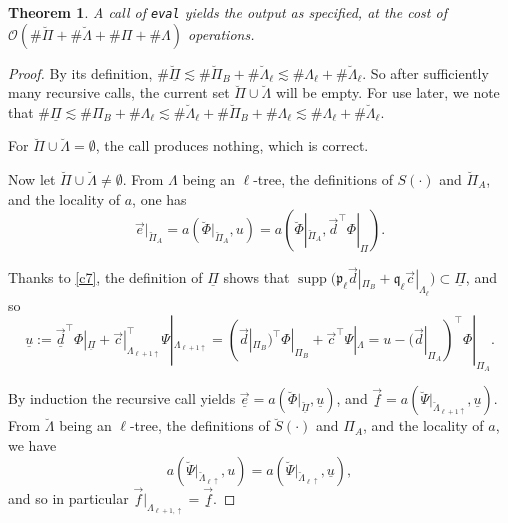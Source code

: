 \documentclass{amsart}
\newtheorem{theorem}{Theorem}[section]
\theoremstyle{definition}
\theoremstyle{remark}
\numberwithin{equation}{section}
\DeclareMathOperator{\supp}{supp}
\newcommand{\1}{\mathbb 1}
\begin{document}
\newpage
 
 \begin{theorem} A call of \texttt{eval} yields the output as specified, at the cost of
 ${\mathcal O}(\# \breve{\Pi}+\# \breve{\Lambda}+\# \Pi+\# \Lambda)$ operations.
 
 \end{theorem}
 
 \begin{proof}
By its definition, $\# \breve{\underline{\Pi}} \lesssim \#\breve{\Pi}_B +\# \breve{\Lambda}_\ell \lesssim \# \Lambda_\ell+\# \breve{\Lambda}_\ell$. So after sufficiently many recursive calls, the current set  $\breve{\Pi}  \cup \breve{\Lambda}$ will be empty.
For use later, we note that 
 $\# \underline{\Pi}  \lesssim \#\Pi_B +\#\Lambda_\ell \lesssim \#\breve{\Lambda}_\ell+\#\breve{\Pi}_B +\#\Lambda_\ell \lesssim \#\Lambda_\ell+\#\breve{\Lambda}_\ell$.

 For $\breve{\Pi}  \cup \breve{\Lambda}= \emptyset$, the call produces nothing, which is correct.
  

Now let  $\breve{\Pi}  \cup \breve{\Lambda} \neq \emptyset$.
From $\Lambda$ being an $\ell$-tree, the definitions of $S(\cdot)$ and $\breve{\Pi}_A$, and the locality of $a$, one has
 $$
 \vec{e}|_{\breve{\Pi}_A}=a(\breve{\Phi}|_{\breve{\Pi}_A},u)=a(\breve{\Phi}|_{\breve{\Pi}_A},\vec{d}^\top\Phi|_{\Pi}).
 $$
 
 Thanks to \eqref{c7}, the definition of $\underline{\Pi}$ shows that $\supp \big( \mathfrak{p}_{\ell} \vec{d}|_{\Pi_B}+\mathfrak{q}_\ell \vec{c}|_{\Lambda_{\ell}}\big) \subset \underline{\Pi}$, and so
  $$
 \underline{u}:=\underline{\vec{d}}^\top\Phi|_{\underline{\Pi}}+\vec{c}|_{\Lambda_{\ell+1\uparrow}}^\top \Psi|_{\Lambda_{\ell+1\uparrow}} =(\vec{d}|_{\Pi_B})^\top \Phi|_{\Pi_B} +\vec{c}^\top \Psi|_{\Lambda}=u-(\vec{d}|_{\Pi_A})^\top \Phi|_{\Pi_A}.
 $$
 
By induction the recursive call  yields
 $\underline{\vec{e}}=a(\breve{\Phi}|_{\breve{\underline{\Pi}}}, \underline{u})$, and
 $\underline{\vec{f}}=a(\breve{\Psi}|_{\breve{\Lambda}_{\ell+1 \uparrow}}, \underline{u})$.
 From  $\breve{\Lambda}$ being an $\ell$-tree, the definitions of $\breve{S}(\cdot)$ and $\Pi_A$, and the locality of $a$, we have
 $$
 a(\breve{\Psi}|_{\breve{\Lambda}_{\ell \uparrow}}, u)=a(\breve{\Psi}|_{\breve{\Lambda}_{\ell \uparrow}}, \underline{u}),
 $$
and so in particular $\vec{f}|_{\Lambda_{\ell+1,\uparrow}}=\underline{\vec{f}}$.


\end{proof}
\end{document}
